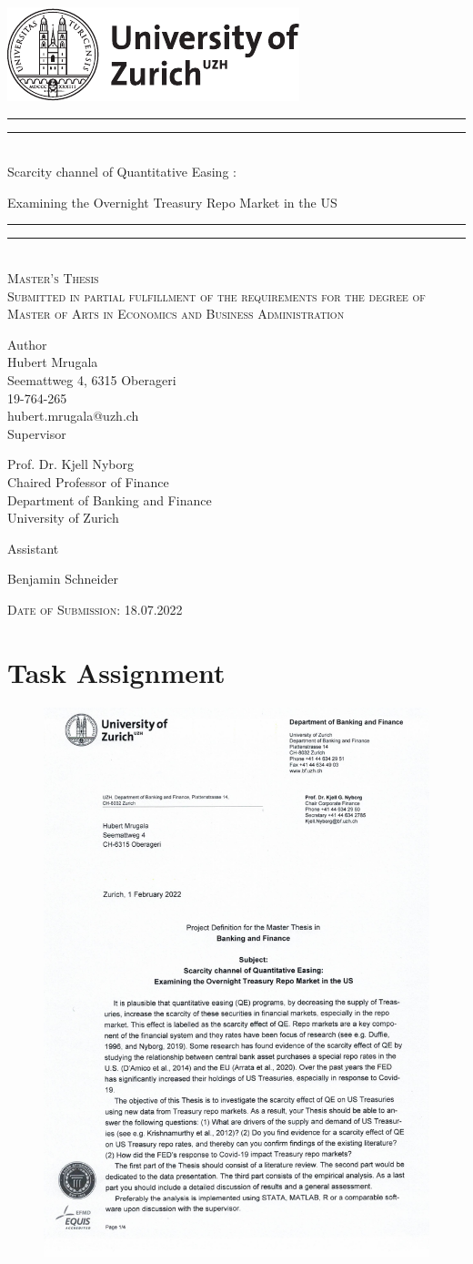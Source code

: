 \documentclass[11pt,a4paper,english,oneside]{article}
\makeatletter
\newcommand*{\plogo}{\includegraphics{./style/uzh_logo_e_pos}}
\newcommand*{\titleGP}{\begingroup %
\centering %
\vspace*{\baselineskip} %
\plogo\\[2\baselineskip] %
\rule{\textwidth}{1.6pt}\vspace*{-\baselineskip}\vspace*{2pt} %
\rule{\textwidth}{0.4pt}\\[\baselineskip] %
{\LARGE Scarcity channel of Quantitative Easing :}

\vspace*{3pt}

{\LARGE Examining the Overnight Treasury Repo Market in the US}\\[0.2\baselineskip] %
\rule{\textwidth}{0.4pt}\vspace*{-\baselineskip}\vspace{3.2pt} %
\rule{\textwidth}{1.6pt}\\[2\baselineskip] %
\scshape %
Master's Thesis\\[2\baselineskip]
Submitted in partial fulfillment of the requirements for the degree of Master of Arts in Economics and Business Administration \par
\vspace*{2\baselineskip}
Author\\
{\Large Hubert Mrugala \\ [5pt]
 }
Seemattweg 4, 6315 Oberageri \\[5pt]
19-764-265 \\[5pt]
hubert.mrugala@uzh.ch \\


\vspace*{2\baselineskip}
Supervisor\\
{\Large Prof. Dr. Kjell Nyborg\\[5pt]\small Chaired Professor of Finance\\[5pt]
\small Department of Banking and Finance\\[5pt]University of Zurich\par}
\vspace*{2\baselineskip}
Assistant\\
{\Large Benjamin Schneider \par}
\vfill
{\scshape Date of Submission: 18.07.2022} \\[0.3\baselineskip] %
\endgroup}
\makeatother
\begin{document}
\thispagestyle{empty}
\titleGP
\newpage
\doublespacing
\setcounter{page}{1}
\section*{Task Assignment}

\begin{figure}[h!]
  \begin{center}
    \includegraphics[page=1,width=.86\textwidth]{../../project_definition.pdf}
  \end{center}
\end{figure}
\newpage
\end{document}
